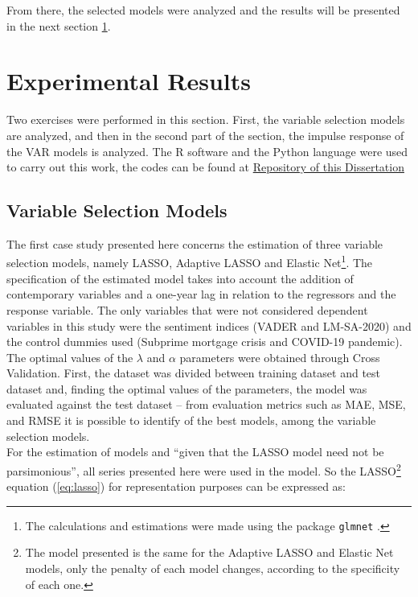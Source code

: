 From there, the selected models were analyzed and the results will be presented in the next  section  \ref{sec:expresults}.

\section{Experimental Results} \label{sec:expresults}

Two exercises were performed in this section. First, the variable selection models are analyzed, and then in the second part of the section, the impulse response of the VAR models is analyzed. The R software and the Python language \cite[]{van1995python} were used to carry out this work, the codes can be found at \href{https://github.com/gustavovital/Dissertation}{Repository of this Dissertation}\\

\subsection{Variable Selection Models}

The first case study presented here concerns the estimation of three variable selection models, namely LASSO, Adaptive LASSO and Elastic Net\footnote{The calculations and estimations were made using the package \texttt{glmnet} \cite[] {glmnet2011noah}.}. The specification of the estimated model takes into account the addition of contemporary variables and a one-year lag in relation to the regressors and the response variable. The only variables that were not considered dependent variables in this study were the sentiment indices (VADER and LM-SA-2020) and the control dummies used (Subprime mortgage crisis and COVID-19 pandemic).\\

The optimal values of the $\lambda$ and $\alpha$ parameters were obtained through Cross Validation. First, the dataset was divided between training dataset and test dataset and, finding the optimal values of the parameters, the model was evaluated against the test dataset -- from evaluation metrics such as MAE, MSE, and RMSE it is possible to identify of the best models, among the variable selection models.\\

For the estimation of models and ``given that the LASSO model need not be parsimonious''\cite[p. 25]{shapiro2020measuring}, all series presented here were used in the model. So the LASSO\footnote{The model presented is the same for the Adaptive LASSO and Elastic Net models, only the penalty of each model changes, according to the specificity of each one.} equation (\ref{eq:lasso}) for representation purposes can be expressed as:


